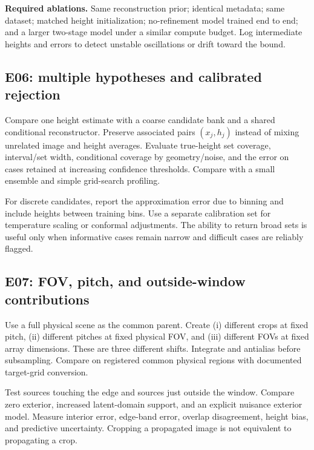 \textbf{Required ablations.} Same reconstruction prior; identical metadata; same dataset; matched height initialization; no-refinement model trained end to end; and a larger two-stage model under a similar compute budget. Log intermediate heights and errors to detect unstable oscillations or drift toward the bound.


\subsection{E06: multiple hypotheses and calibrated rejection}
Compare one height estimate with a coarse candidate bank and a shared conditional reconstructor. Preserve associated pairs $(x_j,h_j)$ instead of mixing unrelated image and height averages. Evaluate true-height set coverage, interval/set width, conditional coverage by geometry/noise, and the error on cases retained at increasing confidence thresholds. Compare with a small ensemble and simple grid-search profiling.

For discrete candidates, report the approximation error due to binning and include heights between training bins. Use a separate calibration set for temperature scaling or conformal adjustments. The ability to return broad sets is useful only when informative cases remain narrow and difficult cases are reliably flagged.

\subsection{E07: FOV, pitch, and outside-window contributions}
Use a full physical scene as the common parent. Create (i) different crops at fixed pitch, (ii) different pitches at fixed physical FOV, and (iii) different FOVs at fixed array dimensions. These are three different shifts. Integrate and antialias before subsampling. Compare on registered common physical regions with documented target-grid conversion.

Test sources touching the edge and sources just outside the window. Compare zero exterior, increased latent-domain support, and an explicit nuisance exterior model. Measure interior error, edge-band error, overlap disagreement, height bias, and predictive uncertainty. Cropping a propagated image is not equivalent to propagating a crop.

